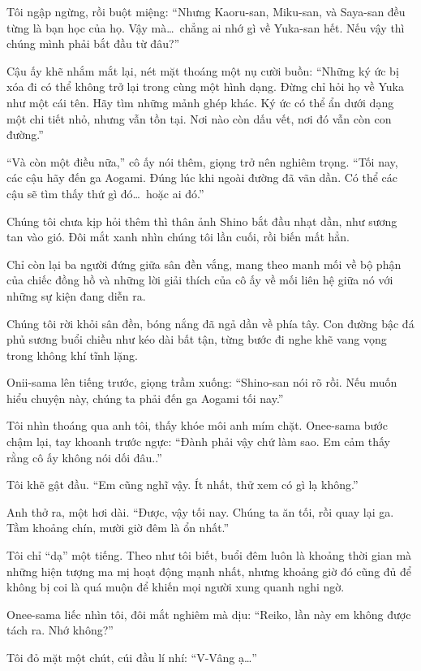 \documentclass[../main.tex]{subfiles}
\begin{document}
Tôi ngập ngừng, rồi buột miệng: ``Nhưng Kaoru-san, Miku-san, và Saya-san đều từng là bạn học của họ. Vậy mà\dots\ chẳng ai nhớ gì về Yuka-san hết. Nếu vậy thì chúng mình phải bắt đầu từ đâu?''

Cậu ấy khẽ nhắm mắt lại, nét mặt thoáng một nụ cười buồn: ``Những ký ức bị xóa đi có thể không trở lại trong cùng một hình dạng. Đừng chỉ hỏi họ về Yuka như một cái tên. Hãy tìm những mảnh ghép khác. Ký ức có thể ẩn dưới dạng một chi tiết nhỏ, nhưng vẫn tồn tại. Nơi nào còn dấu vết, nơi đó vẫn còn con đường.''

``Và còn một điều nữa,'' cô ấy nói thêm, giọng trở nên nghiêm trọng. ``Tối nay, các cậu hãy đến ga Aogami. Đúng lúc khi ngoài đường đã vãn dần. Có thể các cậu sẽ tìm thấy thứ gì đó\dots\ hoặc ai đó.''

Chúng tôi chưa kịp hỏi thêm thì thân ảnh Shino bắt đầu nhạt dần, như sương tan vào gió. Đôi mắt xanh nhìn chúng tôi lần cuối, rồi biến mất hẳn.

Chỉ còn lại ba người đứng giữa sân đền vắng, mang theo manh mối về bộ phận của chiếc đồng hồ và những lời giải thích của cô ấy về mối liên hệ giữa nó với những sự kiện đang diễn ra.

Chúng tôi rời khỏi sân đền, bóng nắng đã ngả dần về phía tây. Con đường bậc đá phủ sương buổi chiều như kéo dài bất tận, từng bước đi nghe khẽ vang vọng trong không khí tĩnh lặng.

Onii-sama lên tiếng trước, giọng trầm xuống: ``Shino-san nói rõ rồi. Nếu muốn hiểu chuyện này, chúng ta phải đến ga Aogami tối nay.''

Tôi nhìn thoáng qua anh tôi, thấy khóe môi anh mím chặt. Onee-sama bước chậm lại, tay khoanh trước ngực: ``Đành phải vậy chứ làm sao. Em cảm thấy rằng cô ấy không nói dối đâu..''

Tôi khẽ gật đầu. ``Em cũng nghĩ vậy. Ít nhất, thử xem có gì lạ không.''

Anh thở ra, một hơi dài. ``Được, vậy tối nay. Chúng ta ăn tối, rồi quay lại ga. Tầm khoảng chín, mười giờ đêm là ổn nhất.''

Tôi chỉ ``dạ'' một tiếng. Theo như tôi biết, buổi đêm luôn là khoảng thời gian mà những hiện tượng ma mị hoạt động mạnh nhất, nhưng khoảng giờ đó cũng đủ để không bị coi là quá muộn để khiến mọi người xung quanh nghi ngờ.

Onee-sama liếc nhìn tôi, đôi mắt nghiêm mà dịu: ``Reiko, lần này em không được tách ra. Nhớ không?''

Tôi đỏ mặt một chút, cúi đầu lí nhí: ``V-Vâng ạ\dots''
\end{document}
